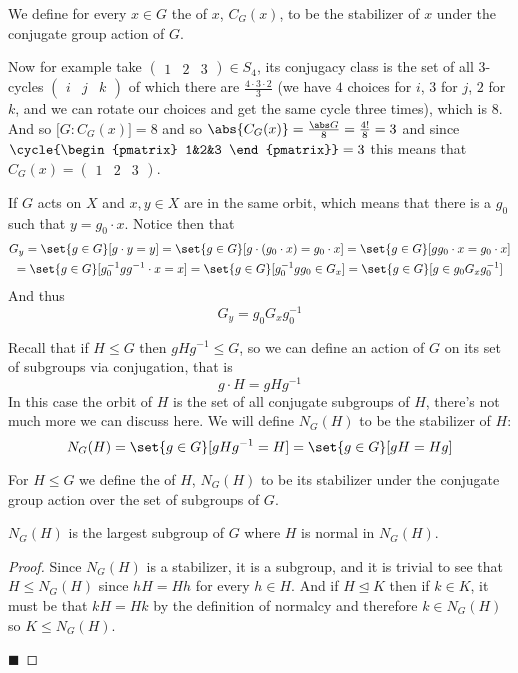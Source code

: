 \documentclass[10pt]{article}
\def\pmat#1{\begin{pmatrix} #1 \end{pmatrix}}
\let\normalsub=\trianglelefteq
\begin{document}
\begin{defn*}

    We define for every $x\in G$ the  of $x$, $C_G(x)$, to be the stabilizer of $x$ under the conjugate group action of $G$.

\end{defn*}

Now for example take $\pmat{1&2&3}\in S_4$, its conjugacy class is the set of all $3$-cycles $\pmat{i&j&k}$ of which there are $\frac{4\cdot3\cdot2}3$ (we have $4$ choices for $i$, $3$ for $j$, $2$ for $k$,
and we can rotate our choices and get the same cycle three times), which is $8$.
And so $\bigl[G:C_G(x)\bigr]=8$ and so $\abs{C_G(x)}=\frac{\abs G}8=\frac{4!}8=3$ and since $\cycle{\pmat{1&2&3}}=3$ this means that $C_G(x)=\pmat{1&2&3}$.

If $G$ acts on $X$ and $x,y\in X$ are in the same orbit, which means that there is a $g_0$ such that $y=g_0\cdot x$.
Notice then that
\begin{multline*}
G_y = \set{g\in G}[g\cdot y=y]  = \set{g\in G}[g\cdot(g_0\cdot x)=g_0\cdot x] = \set{g\in G}[gg_0\cdot x=g_0\cdot x] \\
= \set{g\in G}[g_0^{-1}gg^{-1}\cdot x=x] = \set{g\in G}[g_0^{-1}gg_0\in G_x] = \set{g\in G}[g\in g_0G_xg_0^{-1}]
\end{multline*}
And thus
\[ G_y = g_0G_xg_0^{-1} \]

Recall that if $H\leq G$ then $gHg^{-1}\leq G$, so we can define an action of $G$ on its set of subgroups via conjugation, that is
\[ g\cdot H=gHg^{-1} \]
In this case the orbit of $H$ is the set of all conjugate subgroups of $H$, there's not much more we can discuss here.
We will define $N_G(H)$ to be the stabilizer of $H$:
\[ N_G(H) = \set{g\in G}[gHg^{-1}=H] = \set{g\in G}[gH=Hg] \]

\begin{defn*}

    For $H\leq G$ we define the  of $H$, $N_G(H)$ to be its stabilizer under the conjugate group action over the set of subgroups of $G$.

\end{defn*}

\begin{prop*}

    $N_G(H)$ is the largest subgroup of $G$ where $H$ is normal in $N_G(H)$.

\end{prop*}

\begin{proof}

    Since $N_G(H)$ is a stabilizer, it is a subgroup, and it is trivial to see that $H\leq N_G(H)$ since $hH=Hh$ for every $h\in H$.
    And if $H\normalsub K$ then if $k\in K$, it must be that $kH=Hk$ by the definition of normalcy and therefore $k\in N_G(H)$ so $K\leq N_G(H)$.

    \hfill$\blacksquare$

\end{proof}
\end{document}
